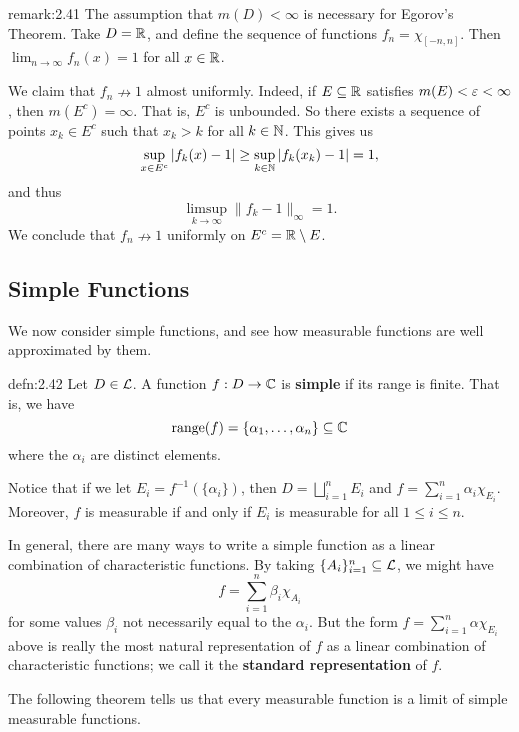 \begin{remark}{remark:2.41}
    The assumption that $m(D) < \infty$ is necessary for Egorov's Theorem. 
    Take $D = \mathbb{R}$, and define the sequence of functions $f_n = \chi_{[-n, n]}$. 
    Then $\lim_{n\to\infty} f_n(x) = 1$ for all $x \in \mathbb{R}$. 

    We claim that $f_n \nrightarrow 1$ almost uniformly. Indeed, if 
    $E \subseteq \mathbb{R}$ satisfies $m(E) < \varepsilon < \infty$, then $m(E^c) = \infty$. 
    That is, $E^c$ is unbounded. So there exists a sequence of points 
    $x_k \in E^c$ such that $x_k > k$ for all $k \in \mathbb{N}$. This gives us 
    \[ \sup_{x\in E^c} |f_k(x) - 1| \geq \sup_{k\in\mathbb{N}} |f_k(x_k) - 1| = 1, \] 
    and thus 
    \[ \limsup_{k\to\infty} \|f_k - 1\|_\infty = 1. \] 
    We conclude that $f_n \nrightarrow 1$ uniformly on $E^c = \mathbb{R} \setminus E$.
\end{remark}

\subsection{Simple Functions} \label{subsec:2.6}
We now consider simple functions, and see how measurable functions are 
well approximated by them. 

\begin{defn}{defn:2.42}
    Let $D \in {\cal L}$. A function $f : D \to \mathbb{C}$ is {\bf simple} if 
    its range is finite. That is, we have 
    \[ \text{range}(f) = \{\alpha_1, \dots, \alpha_n\} \subseteq \mathbb{C} \] 
    where the $\alpha_i$ are distinct elements. 
\end{defn}

Notice that if we let $E_i = f^{-1}(\{\alpha_i\})$, then $D = 
\bigsqcup_{i=1}^n E_i$ and $f = \sum_{i=1}^n \alpha_i \chi_{E_i}$. 
Moreover, $f$ is measurable if and only if $E_i$ is measurable for all 
$1 \leq i \leq n$. 

In general, there are many ways to write a simple function as a linear 
combination of characteristic functions. By taking $\{A_i\}_{i=1}^n 
\subseteq {\cal L}$, we might have 
\[ f = \sum_{i=1}^n \beta_i \chi_{A_i} \] 
for some values $\beta_i$ not necessarily equal to the $\alpha_i$. 
But the form $f = \sum_{i=1}^n \alpha \chi_{E_i}$ above is really the 
most natural representation of $f$ as a linear combination of 
characteristic functions; we call it the {\bf standard representation} of $f$. 

The following theorem tells us that every measurable function is a limit 
of simple measurable functions. 

